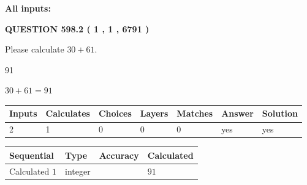 \documentclass[12pt]{article}
\begin{document}
   
   
   
\noindent{}
   
   
   
   
\noindent\vspace{0.1in}\hspace{-0.08in} {\textbf{\Large{All inputs: }}}
   
   
  
\vspace{0.2in}
  
{\textbf{\Large{QUESTION
598.2 
 ( 1 , 1 , 6791 )
}}}
  
  
 
Please calculate $ %
30 +  %
61 $.
 
 
 
\noindent{}
 
 

91
 
 
\noindent{}
 
 

 
 
 
\noindent{}
 
 

$ %
30 +  %
61=   %
91$
 
 
\noindent{}
 
 

 
   
   
   
   
\noindent\begin{tabular}{|l|l|l|l|l|l|l|}
 \hline
Inputs & Calculates & Choices & Layers & Matches & Answer & Solution \\ \hline
 2  & 
 1  & 
 0
  & 
 0  & 
 0  & 
  yes & 
  yes 
  \\ \hline
 \end{tabular}
   
   
   
   
\noindent{}
   
   
  
  
\noindent\begin{tabular}{|l|l|l|l|}
\hline
 Sequential & Type & Accuracy & Calculated \\ 
\hline
 
 
  Calculated $  1 $ & integer &  & 
  $ 91 $ 
 \\  \hline  
 \end{tabular}
   
\end{document}
